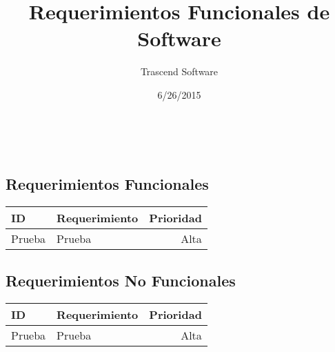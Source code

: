 \documentclass{article}
\title{Requerimientos Funcionales de Software}
\date
{
6/26/2015
}
\author{
Trascend Software
}
\begin{document}


\maketitle %
\newpage %
\
\begin{center}
	\section*{Requerimientos Funcionales}
\begin{tabular}{| l | p{7cm} | r |}
\hline
\bf ID & \bf Requerimiento & \bf Prioridad \\
\hline
Prueba&Prueba&Alta \\
\hline
\end{tabular}
\end{center}

\newpage
\begin{center}
	\section*{Requerimientos No Funcionales}
\begin{tabular}{| l | p{7cm} | r |}
\hline
\bf ID & \bf Requerimiento & \bf Prioridad \\
\hline
Prueba&Prueba&Alta \\
\hline
\end{tabular}
\end{center}
\end{document}
